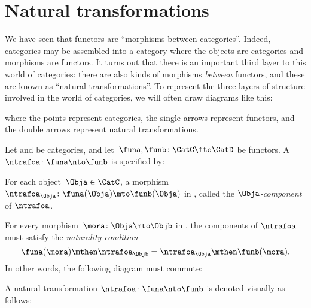 \section{Natural transformations}

We have seen that functors are ``morphisms between categories''. Indeed, categories may be assembled into a category \index{\Category} where the objects are categories and morphisms are functors. It turns out that there is an important third layer to this world of categories: there are also kinds of morphisms \emph{between} functors, and these are known as ``natural transformations''. To represent the three layers of structure involved in the world of categories, we will often draw diagrams like this:
\begin{figure}[h!]
  \label{fig:3-layer-diagrams}
\end{figure}

where the points represent categories, the single arrows represent functors, and the double arrows represent natural transformations.


\begin{ctdefinition}
  \label{def:natural-transformation}
  Let \CatC and \CatD be categories, and let~$\funa,\funb\colon \CatC\fto \CatD$ be functors. A \emph{}~$\ntrafoa \colon \funa\nto \funb$ is specified by: 
  
  
  \constit
  \begin{compactenum}
    \item For each object~$\Obja\in \CatC$, a morphism $\ntrafoa_\Obja \colon \funa(\Obja)\mto \funb(\Obja)$ in \CatD, called the $\Obja$\emph{-component} of $\ntrafoa$.
  \end{compactenum}
  \condit
  \begin{compactenum}
    \item For every morphism~$\mora\colon \Obja\mto \Objb$ in \CatC, the components of $\ntrafoa$ must satisfy the \emph{naturality condition}
    \begin{equation}
      \funa(\mora)\mthen \ntrafoa_\Objb = \ntrafoa_\Obja\mthen \funb(\mora).
    \end{equation}
    In other words, the following diagram must commute:
    \begin{center}
    \end{center}
  \end{compactenum}
A natural transformation $\ntrafoa \colon \funa\nto \funb$ is denoted visually as follows: 
  \begin{center}
  \end{center}
\end{ctdefinition}

